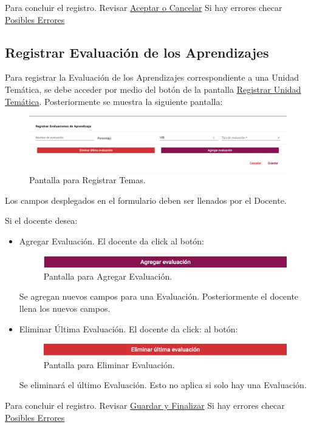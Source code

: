 Para concluir el registro. Revisar \hyperlink{AceptarCancelar}{Aceptar o Cancelar}
Si hay errores checar \hyperlink{Errores}{Posibles Errores}

\pagebreak
\hypertarget{RegistrarEvalAprend}{\subsection{Registrar Evaluación de los Aprendizajes}}

Para registrar la Evaluación de los Aprendizajes correspondiente a una Unidad Temática, se debe acceder por medio del botón  de la pantalla \hyperlink{RUT}{Registrar Unidad Temática}. Posteriormente se muestra la siguiente pantalla:

\hypertarget{REvalApre}{}
\begin{figure}[!hbtp]
    \centering
    \includegraphics[width=0.7\linewidth]{images/SP6/RegistrarEvadeApren.png}
    \caption{Pantalla para Registrar Temas.} 
\end{figure}

Los campos desplegados en el formulario deben ser llenados por el Docente.

Si el docente desea:
\begin{itemize}
    \item Agregar Evaluación. El docente da click al botón:
    \begin{figure}[!hbtp]
    \centering
    \includegraphics[width=0.4\linewidth]{images/SP6/AgregarEval.png}
    \caption{Pantalla para Agregar Evaluación.} 
    \end{figure}
    Se agregan nuevos campos para una Evaluación. Posteriormente el docente llena los nuevos campos.
    \item Eliminar Última Evaluación. El docente da click: al botón:
    \begin{figure}[!hbtp]
    \centering
    \includegraphics[width=0.4\linewidth]{images/SP6/ElimarEval.png}
    \caption{Pantalla para Eliminar Evaluación.} 
    \end{figure}
    Se eliminará el último Evaluación. Esto no aplica si solo hay una Evaluación.
\end{itemize}

Para concluir el registro. Revisar \hyperlink{GuardarFinalizar}{Guardar y Finalizar}
Si hay errores checar \hyperlink{Errores}{Posibles Errores}
\pagebreak

